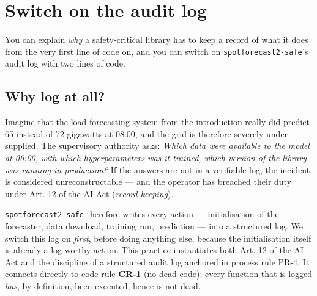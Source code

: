 \documentclass[
  english,
  letterpaper,
]{scrbook}
\begin{document}

\chapter{Switch on the audit log}\label{sec-audit}

\begin{tcolorbox}[enhanced jigsaw, arc=.35mm, bottomrule=.15mm, bottomtitle=1mm, breakable, colback=white, colbacktitle=quarto-callout-note-color!10!white, colframe=quarto-callout-note-color-frame, coltitle=black, left=2mm, leftrule=.75mm, opacityback=0, opacitybacktitle=0.6, rightrule=.15mm, title=\textcolor{quarto-callout-note-color}{\faInfo}\hspace{0.5em}{Learning objective}, titlerule=0mm, toprule=.15mm, toptitle=1mm]

You can explain \emph{why} a safety-critical library has to keep a
record of what it does from the very first line of code on, and you can
switch on \texttt{spotforecast2-safe}'s audit log with two lines of
code.

\end{tcolorbox}

\section{Why log at all?}\label{why-log-at-all}

Imagine that the load-forecasting system from the introduction really
did predict 65 instead of 72 gigawatts at 08:00, and the grid is
therefore severely under-supplied. The supervisory authority asks:
\emph{Which data were available to the model at 06:00, with which
hyperparameters was it trained, which version of the library was running
in production?} If the answers are not in a verifiable log, the incident
is considered unreconstructable --- and the operator has breached their
duty under Art. 12 of the AI Act (\emph{record-keeping}).

\texttt{spotforecast2-safe} therefore writes every action ---
initialisation of the forecaster, data download, training run,
prediction --- into a structured log. We switch this log on
\emph{first}, before doing anything else, because the initialisation
itself is already a log-worthy action. This practice instantiates both
Art. 12 of the AI Act and the discipline of a structured audit log
anchored in process rule PR-4. It connects directly to code rule
\textbf{CR-1} (no dead code): every function that is logged \emph{has},
by definition, been executed, hence is not dead.
\end{document}
